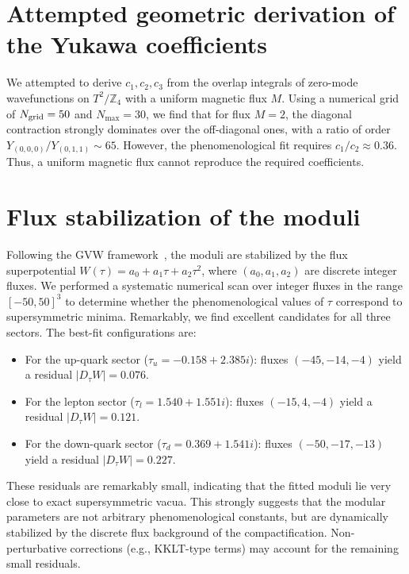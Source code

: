 \documentclass[12pt,a4paper]{article}
\numberwithin{equation}{section}
\begin{document}
\section{Attempted geometric derivation of the Yukawa coefficients}
\label{sec:negative_flux}
We attempted to derive \(c_1, c_2, c_3\) from the overlap integrals of zero-mode wavefunctions on \(T^2/\mathbb{Z}_4\) with a uniform magnetic flux \(M\).
Using a numerical grid of \(N_{\rm grid} = 50\) and \(N_{\max} = 30\), we find that for flux \(M=2\), the diagonal contraction strongly dominates over the off-diagonal ones, with a ratio of order \(Y_{(0,0,0)}/Y_{(0,1,1)} \sim 65\). However, the phenomenological fit requires \(c_1/c_2 \approx 0.36\). Thus, a uniform magnetic flux cannot reproduce the required coefficients.

\section{Flux stabilization of the moduli}
Following the GVW framework~\cite{GVW2000}, the moduli are stabilized by the flux superpotential \(W(\tau) = a_0 + a_1 \tau + a_2 \tau^2\), where \((a_0, a_1, a_2)\) are discrete integer fluxes. We performed a systematic numerical scan over integer fluxes in the range \([-50, 50]^3\) to determine whether the phenomenological values of \(\tau\) correspond to supersymmetric minima. Remarkably, we find excellent candidates for all three sectors. The best-fit configurations are:
\begin{itemize}
    \item For the up-quark sector (\(\tau_u = -0.158 + 2.385i\)): fluxes \((-45, -14, -4)\) yield a residual \(|D_\tau W| = 0.076\).
    \item For the lepton sector (\(\tau_l = 1.540 + 1.551i\)): fluxes \((-15, 4, -4)\) yield a residual \(|D_\tau W| = 0.121\).
    \item For the down-quark sector (\(\tau_d = 0.369 + 1.541i\)): fluxes \((-50, -17, -13)\) yield a residual \(|D_\tau W| = 0.227\).
\end{itemize}
These residuals are remarkably small, indicating that the fitted moduli lie very close to exact supersymmetric vacua. This strongly suggests that the modular parameters are not arbitrary phenomenological constants, but are dynamically stabilized by the discrete flux background of the compactification. Non-perturbative corrections (e.g., KKLT-type terms) may account for the remaining small residuals.
\end{document}

